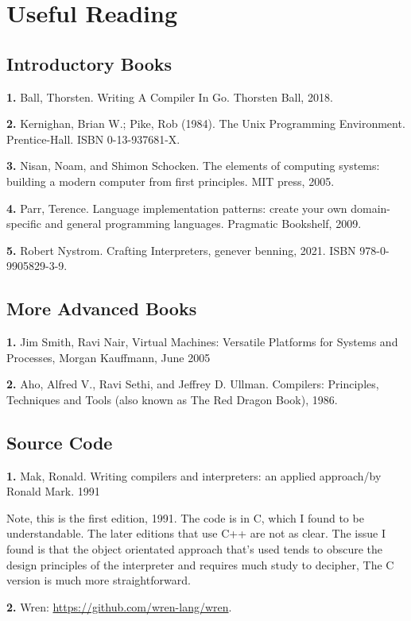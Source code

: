 \section{Useful Reading}

\subsection*{Introductory Books}

{\bf 1.} Ball, Thorsten. Writing A Compiler In Go. Thorsten Ball, 2018.

{\bf 2.} Kernighan, Brian W.; Pike, Rob (1984). The Unix Programming Environment. Prentice-Hall. ISBN 0-13-937681-X.

{\bf 3.} Nisan, Noam, and Shimon Schocken. The elements of computing systems: building a modern computer from first principles. MIT press, 2005.

{\bf 4.} Parr, Terence. Language implementation patterns: create your own domain-specific and general programming languages. Pragmatic Bookshelf, 2009.

{\bf 5.} Robert Nystrom. Crafting Interpreters, genever benning, 2021. ISBN 978-0-9905829-3-9.

\subsection*{More Advanced Books}

{\bf 1.} Jim Smith, Ravi Nair, Virtual Machines: Versatile Platforms for Systems and Processes, Morgan Kauffmann, June 2005

{\bf 2.} Aho, Alfred V., Ravi Sethi, and Jeffrey D. Ullman. Compilers: Principles, Techniques and Tools (also known as The Red Dragon Book), 1986.

\subsection*{Source Code}

{\bf 1.} Mak, Ronald. Writing compilers and interpreters: an applied approach/by Ronald Mark. 1991

Note, this is the first edition, 1991. The code is in C, which I found to be understandable. The later editions that use C++ are not as clear. The issue I found is that the object orientated approach that's used tends to obscure the design principles of the interpreter and requires much study to decipher, The C version is much more straightforward.

{\bf 2.} Wren: \url{https://github.com/wren-lang/wren}.

